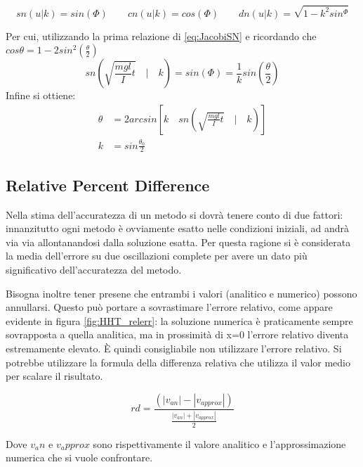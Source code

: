 \begin{equation} \label{eq:JacobiSN}
    sn(u|k) = sin(\Phi) \qquad cn(u|k) = cos(\Phi) \qquad dn(u|k) = \sqrt{1-k^2sin^\Phi}
\end{equation}

Per cui, utilizzando la prima relazione di \ref{eq:JacobiSN} \newline e ricordando che \( cos\theta = 1-2sin^2\left(\frac{\theta}{2}\right) \)
\begin{equation}
    sn\left( \sqrt{\frac{mgl}{I}t} \quad | \quad k \right) = sin(\Phi) = \frac{1}{k}sin\left(\frac{\theta}{2}\right)
\end{equation}
Infine si ottiene:
\begin{align}
    \theta &= 2 arcsin \left[ k \quad sn\left( \sqrt{\frac{mgl}{I}t} \quad | \quad k \right)   \right] 
    \\ \nonumber  k &= sin\frac{\theta_0}{2}
\end{align}

\subsection{Relative Percent Difference}
Nella stima dell'accuratezza di un metodo si dovrà tenere conto di due fattori: innanzitutto ogni metodo è ovviamente esatto nelle condizioni iniziali, ad andrà via via allontanandosi dalla soluzione esatta. Per questa ragione si è considerata la media dell'errore su due oscillazioni complete per avere un dato più significativo dell'accuratezza del metodo.

Bisogna inoltre tener presene che entrambi i valori (analitico e numerico) possono annullarsi. Questo può portare a sovrastimare l'errore relativo, come appare evidente in figura \ref{fig:HHT_relerr}: la soluzione numerica è praticamente sempre sovrapposta a quella analitica, ma in prossimità di x=0 l'errore relativo diventa estremamente elevato. È quindi consigliabile non utilizzare l'errore relativo. Si potrebbe utilizzare la formula della differenza relativa che utilizza il valor medio per scalare il risultato. 

\begin{equation}
    rd = \frac{(|v_{an}| - |v_{approx}|)}  { \frac{|v_{an}| + |v_{approx}|}{2}  }
\end{equation}

Dove $v_an$ e $v_approx$ sono rispettivamente il valore analitico e l'approssimazione numerica che si vuole confrontare.

